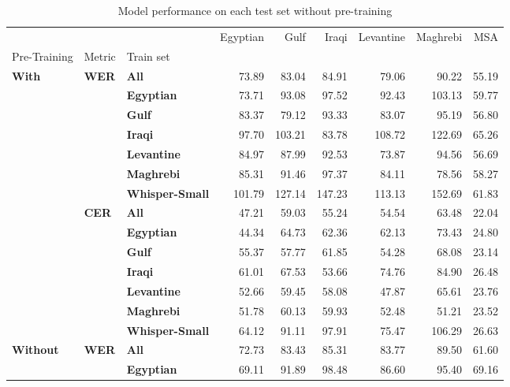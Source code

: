 \begin{table}
\caption{Model performance on each test set without pre-training}
\label{tab:all_res}
\begin{tabular}{lllrrrrrr}
\toprule
 &  &  & Egyptian & Gulf & Iraqi & Levantine & Maghrebi & MSA \\
Pre-Training & Metric & Train set &  &  &  &  &  &  \\
\midrule
\multirow[t]{14}{*}{\textbf{With}} & \multirow[t]{7}{*}{\textbf{WER}} & \textbf{All} & 73.89 & 83.04 & 84.91 & 79.06 & 90.22 & 55.19 \\
\textbf{} & \textbf{} & \textbf{Egyptian} & 73.71 & 93.08 & 97.52 & 92.43 & 103.13 & 59.77 \\
\textbf{} & \textbf{} & \textbf{Gulf} & 83.37 & 79.12 & 93.33 & 83.07 & 95.19 & 56.80 \\
\textbf{} & \textbf{} & \textbf{Iraqi} & 97.70 & 103.21 & 83.78 & 108.72 & 122.69 & 65.26 \\
\textbf{} & \textbf{} & \textbf{Levantine} & 84.97 & 87.99 & 92.53 & 73.87 & 94.56 & 56.69 \\
\textbf{} & \textbf{} & \textbf{Maghrebi} & 85.31 & 91.46 & 97.37 & 84.11 & 78.56 & 58.27 \\
\textbf{} & \textbf{} & \textbf{Whisper-Small} & 101.79 & 127.14 & 147.23 & 113.13 & 152.69 & 61.83 \\
\cline{2-9}
\textbf{} & \multirow[t]{7}{*}{\textbf{CER}} & \textbf{All} & 47.21 & 59.03 & 55.24 & 54.54 & 63.48 & 22.04 \\
\textbf{} & \textbf{} & \textbf{Egyptian} & 44.34 & 64.73 & 62.36 & 62.13 & 73.43 & 24.80 \\
\textbf{} & \textbf{} & \textbf{Gulf} & 55.37 & 57.77 & 61.85 & 54.28 & 68.08 & 23.14 \\
\textbf{} & \textbf{} & \textbf{Iraqi} & 61.01 & 67.53 & 53.66 & 74.76 & 84.90 & 26.48 \\
\textbf{} & \textbf{} & \textbf{Levantine} & 52.66 & 59.45 & 58.08 & 47.87 & 65.61 & 23.76 \\
\textbf{} & \textbf{} & \textbf{Maghrebi} & 51.78 & 60.13 & 59.93 & 52.48 & 51.21 & 23.52 \\
\textbf{} & \textbf{} & \textbf{Whisper-Small} & 64.12 & 91.11 & 97.91 & 75.47 & 106.29 & 26.63 \\
\cline{1-9} \cline{2-9}
\multirow[t]{14}{*}{\textbf{Without}} & \multirow[t]{7}{*}{\textbf{WER}} & \textbf{All} & 72.73 & 83.43 & 85.31 & 83.77 & 89.50 & 61.60 \\
\textbf{} & \textbf{} & \textbf{Egyptian} & 69.11 & 91.89 & 98.48 & 86.60 & 95.40 & 69.16 \\

\end{tabular}
\end{table}
